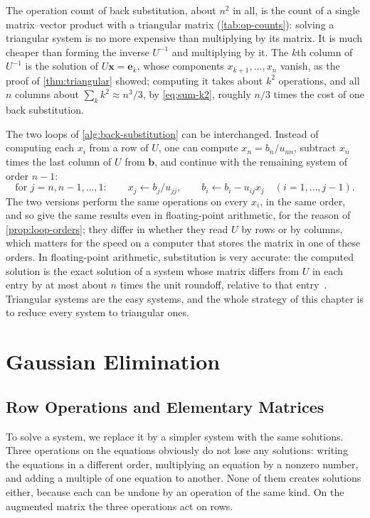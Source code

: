 The operation count of back substitution, about $n^2$ in all, is the count of a single matrix--vector product with a triangular matrix (\cref{tab:op-counts}): solving a triangular system is no more expensive than multiplying by its matrix. It is much cheaper than forming the inverse $U^{-1}$ and multiplying by it. The $k$th column of $U^{-1}$ is the solution of $U\mathbf x=\mathbf e_k$, whose components $x_{k+1},\ldots,x_n$ vanish, as the proof of \cref{thm:triangular} showed; computing it takes about $k^2$ operations, and all $n$ columns about $\sum_kk^2\approx n^3/3$, by \eqref{eq:sum-k2}, roughly $n/3$ times the cost of one back substitution.

The two loops of \cref{alg:back-substitution} can be interchanged. Instead of computing each $x_i$ from a row of $U$, one can compute $x_n=b_n/u_{nn}$, subtract $x_n$ times the last column of $U$ from $\mathbf b$, and continue with the remaining system of order $n-1$:
\[
\text{for }j=n,n-1,\ldots,1:\qquad x_j\gets b_j/u_{jj},\qquad b_i\gets b_i-u_{ij}x_j\quad(i=1,\ldots,j-1).
\]
The two versions perform the same operations on every $x_i$, in the same order, and so give the same results even in floating-point arithmetic, for the reason of \cref{prop:loop-orders}; they differ in whether they read $U$ by rows or by columns, which matters for the speed on a computer that stores the matrix in one of these orders. In floating-point arithmetic, substitution is very accurate: the computed solution is the exact solution of a system whose matrix differs from $U$ in each entry by at most about $n$ times the unit roundoff, relative to that entry~\cite[Chap.~8]{higham2002accuracy}. Triangular systems are the easy systems, and the whole strategy of this chapter is to reduce every system to triangular ones.

\section{Gaussian Elimination}
\label{sec:elimination}

\subsection{Row Operations and Elementary Matrices}

To solve a system, we replace it by a simpler system with the same solutions. Three operations on the equations obviously do not lose any solutions: writing the equations in a different order, multiplying an equation by a nonzero number, and adding a multiple of one equation to another. None of them creates solutions either, because each can be undone by an operation of the same kind. On the augmented matrix the three operations act on rows.

